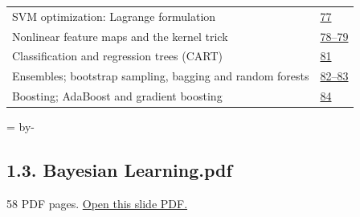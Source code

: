 \documentclass[10pt]{article}
\newcommand{\deckheading}[1]{\par\begingroup\skip0=\pagegoal\advance\skip0 by-\pagetotal\ifdim\skip0<7\baselineskip\newpage\fi\endgroup\subsection{#1}}
\begin{document}
\begin{longtable}{@{}P{.79\linewidth}P{.17\linewidth}@{}}
SVM optimization: Lagrange formulation & \href{../Lecture\%20Slides/1.2.\%20Shallow\%20Learning.pdf\#page=77}{77}\\[3pt]
Nonlinear feature maps and the kernel trick & \href{../Lecture\%20Slides/1.2.\%20Shallow\%20Learning.pdf\#page=78}{78--79}\\[3pt]
Classification and regression trees (CART) & \href{../Lecture\%20Slides/1.2.\%20Shallow\%20Learning.pdf\#page=81}{81}\\[3pt]
Ensembles; bootstrap sampling, bagging and random forests & \href{../Lecture\%20Slides/1.2.\%20Shallow\%20Learning.pdf\#page=82}{82--83}\\[3pt]
Boosting; AdaBoost and gradient boosting & \href{../Lecture\%20Slides/1.2.\%20Shallow\%20Learning.pdf\#page=84}{84}\\[3pt]
\bottomrule\end{longtable}
\deckheading{1.3. Bayesian Learning.pdf}
{\small 58 PDF pages. \href{../Lecture\%20Slides/1.3.\%20Bayesian\%20Learning.pdf}{Open this slide PDF.}}\par
\end{document}
